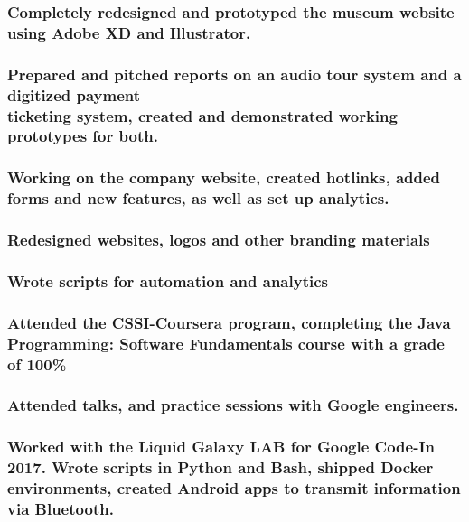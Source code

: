 \documentclass[a4paper]{resume}
\begin{document}
\subsubsection{Completely redesigned and prototyped the museum website using Adobe XD and Illustrator.}
\subsubsection{Prepared and pitched reports on an audio tour system and a digitized payment\\ticketing system, created and demonstrated working prototypes for both.}

\subsubsection{Working on the company website, created hotlinks, added forms and new features, as well as set up analytics.}

\subsubsection{Redesigned websites, logos and other branding materials}
\subsubsection{Wrote scripts for automation and analytics}

\subsubsection{Attended the CSSI-Coursera program, completing the Java Programming: Software Fundamentals course with a grade of 100\%}
\subsubsection{Attended talks, and practice sessions with Google engineers.}

\subsubsection{Worked with the Liquid Galaxy LAB for Google Code-In 2017. Wrote scripts in Python and Bash, shipped Docker environments, created Android apps to transmit information via Bluetooth.}
\end{document}
